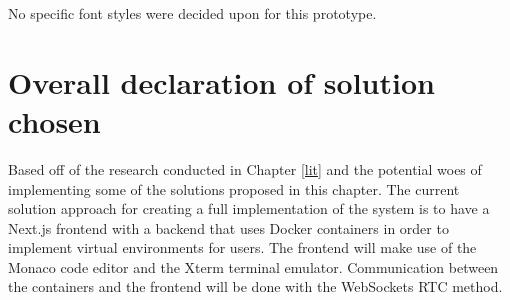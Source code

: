 No specific font styles were decided upon for this prototype.

\section{Overall declaration of solution chosen}

Based off of the research conducted in Chapter \ref{lit} and the potential woes of implementing some of the solutions proposed in this chapter. The current solution approach for creating a full implementation of the system is to have a Next.js frontend with a backend that uses Docker containers in order to implement virtual environments for users. The frontend will make use of the Monaco code editor and the Xterm terminal emulator. Communication between the containers and the frontend will be done with the WebSockets RTC method. 


\pagebreak
